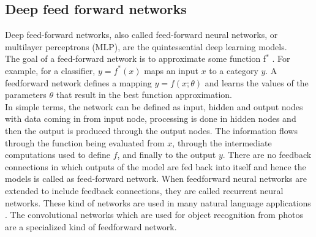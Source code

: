 \subsection{Deep feed forward networks}
Deep feed-forward networks, also called feed-forward neural networks, or multilayer perceptrons (\ac{MLP}), are the quintessential deep learning models.\\
The goal of a feed-forward network is to approximate some function f$^{*}$ . For example, for a classifier, $y = f ^{*} (x)$ maps an input $x$ to a category $y$. A feedforward network defines a mapping $y = f(x;\theta)$ and learns the values of the parameters $\theta$ that result in the best function approximation.\cite{Goodfellow-et-al-2016}\\
In simple terms, the network can be defined as input, hidden and output nodes with data coming in from input node, processing is done in hidden nodes and then the output is produced  through the output nodes. The information  flows through the function being evaluated from $x$, through the intermediate computations used to define $f$, and finally to the output $y$. There are no feedback connections in which outputs of the model are fed back into itself and hence the models is called as feed-forward network. When feedforward neural networks are extended to include feedback connections, they are called recurrent neural networks. These kind of networks are used in many natural language applications \cite{mikolov_recurrent_2010}. The convolutional networks which are used for object recognition from photos are a specialized kind of feedforward network.\cite{Goodfellow-et-al-2016} \\
